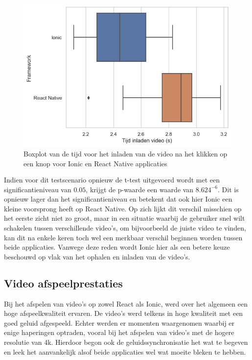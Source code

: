 \begin{figure}
  \centering
  \includegraphics[width=0.7\linewidth]{img/boxplotInteraction}
  \caption{Boxplot van de tijd voor het inladen van de video na het klikken op een knop voor Ionic en React Native applicaties}
  \label{fig:Boxplot van de tijd voor het inladen van de video na het klikken op een knop voor Ionic en React Native applicaties}
\end{figure}

Indien voor dit testscenario opnieuw de t-test uitgevoerd wordt met een significantieniveau van \(0.05\), krijgt de p-waarde een waarde van \(8.624^{-6}\). Dit is opnieuw lager dan het significantieniveau en betekent dat ook hier Ionic een kleine voorsprong heeft op React Native. Op zich lijkt dit verschil misschien op het eerste zicht niet zo groot, maar in een situatie waarbij de gebruiker snel wilt schakelen tussen verschillende video's, om bijvoorbeeld de juiste video te vinden, kan dit na enkele keren toch wel een merkbaar verschil beginnen worden tussen beide applicaties. Vanwege deze reden wordt Ionic hier als een betere keuze beschouwd op vlak van het ophalen en inladen van de video's.


\subsection{Video afspeelprestaties}
\label{subsec:video-afspeelprestaties}

Bij het afspelen van video's op zowel React als Ionic, werd over het algemeen een hoge afspeelkwaliteit ervaren. De video's werd telkens in hoge kwaliteit met een goed geluid afgespeeld. Echter werden er momenten waargenomen waarbij er enige haperingen optraden, vooral bij het afspelen van video's met de hogere resolutie van 4k. Hierdoor begon ook de geluidssynchronisatie het wat te begeven en leek het aanvankelijk alsof beide applicaties wel wat moeite bleken te hebben.

